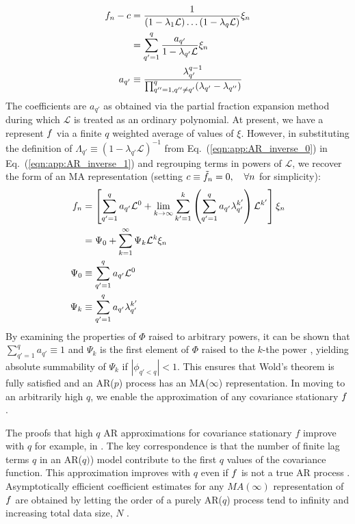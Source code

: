\begin{align}
f_n - c & = \frac{1}{(1 - \lambda_1 \mathcal{L}) \hdots (1 - \lambda_q \mathcal{L})} \xi_n\\
& = \sum_{q'=1}^{q}\frac{a_{q'}}{1- \lambda_{q'} \mathcal{L}} \xi_n  \label{eqn:app:AR_inverse_1}\\
a_{q'} & \equiv \frac{\lambda_{q'}^{q-1}}{\prod_{q''=1, q''\neq q'}^{q} (\lambda_{q'} - \lambda_{q''})}
\end{align} The coefficients are $a_{q'}$ as obtained via the partial fraction expansion method during which $\mathcal{L}$ is treated as an ordinary polynomial. At present, we have a represent $f$ via a finite $q$ weighted average of values of $\xi$. However, in substituting the definition of $ \Lambda_{q'} \equiv (1- \lambda_{q'} \mathcal{L})^{-1}$ from Eq.~(\ref {eqn:app:AR_inverse_0}) in Eq.~(\ref {eqn:app:AR_inverse_1}) and regrouping terms in powers of $\mathcal{L}$, we recover the form of an MA representation (setting $c \equiv \tilde{f}_n  = 0, \quad  \forall n$ for simplicity): 
\begin{align}
f_n & = \left[ \sum_{q'=1}^{q} a_{q'} \mathcal{L}^0 +  \lim_{k \to \infty}  \sum_{k'=1}^{k} \left( \sum_{q'=1}^{q} a_{q'}  \lambda_{q'}^{k'} \right) \mathcal{L}^{k'}\right] \xi_n \\
& = \Psi_0 + \sum_{k=1}^{\infty} \Psi_k \mathcal{L}^k \xi_{n}  \\
\Psi_0 & \equiv \sum_{q'=1}^{q} a_{q'} \mathcal{L}^0  \\
\Psi_k & \equiv \sum_{q'=1}^{q} a_{q'}  \lambda_{q'}^{k'}
\end{align}
By examining the properties of $\Phi$ raised to arbitrary powers, it can be shown that $\sum_{q'=1}^{q} a_{q'} \equiv 1$ and $\Psi_k$ is the first element of $\Phi$ raised to the $k$-the power \cite{hamilton1994time}, yielding absolute summability of $\Psi_k$ if $|\phi_{q'<q}| < 1$. This ensures that Wold's theorem is fully satisfied and an AR($p$) process has an MA($\infty$) representation. In moving to an arbitrarily high $q$, we enable the approximation of any covariance stationary $f$.

The proofs that high $q$ AR approximations for covariance stationary $f$ improve with $q$ for example, in \cite{wahlberg1989estimation}. The key correspondence is that the number of finite lag terms $q$ in an AR($q)$) model contribute to the first $q$ values of the covariance function. This approximation improves with $q$ even if $f$ is not a true AR process \cite{wahlberg1989estimation,west1996bayesian}. Asymptotically efficient coefficient estimates for any $MA(\infty)$ representation of $f$ are obtained by letting the order of a purely AR($q$) process tend to infinity and increasing total data size, $N$ \cite{wahlberg1989estimation}. 

